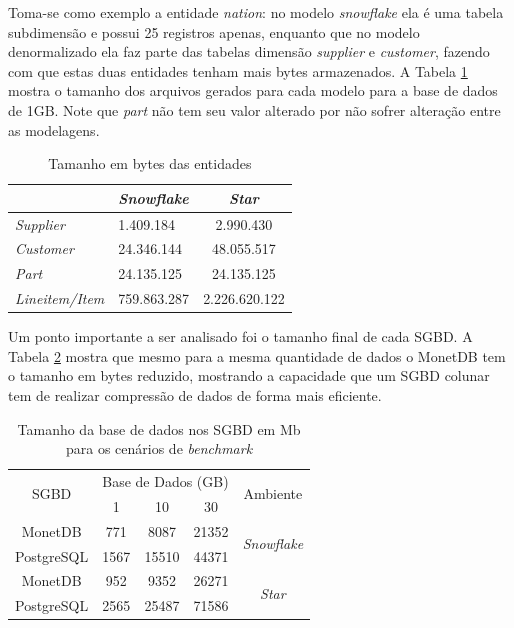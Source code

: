 Toma-se como exemplo a entidade \textit{nation}: no modelo \textit{snowflake} ela é uma tabela subdimensão e possui 25 registros apenas, enquanto que no modelo denormalizado ela faz parte das tabelas dimensão \textit{supplier} e \textit{customer}, fazendo com que estas duas entidades tenham mais bytes armazenados. A Tabela \ref{tab:tamanho} mostra o tamanho dos arquivos gerados para cada modelo para a base de dados de 1GB. Note que \textit{part} não tem seu valor alterado por não sofrer alteração entre as modelagens.

\begin{table}[htpb]
        \centering
        \caption{Tamanho em bytes das entidades}
        \label{tab:tamanho}
        \begin{tabular}{l|l|c|}
        \cline{2-3}
                                                     & \textit{Snowflake} & \textit{Star} \\ \hline
        \multicolumn{1}{|l|}{\textit{Supplier}}      & 1.409.184          & 2.990.430     \\ \hline
        \multicolumn{1}{|l|}{\textit{Customer}}      & 24.346.144         & 48.055.517    \\ \hline
        \multicolumn{1}{|l|}{\textit{Part}}          & 24.135.125         & 24.135.125    \\ \hline
        \multicolumn{1}{|l|}{\textit{Lineitem/Item}} & 759.863.287        & 2.226.620.122 \\ \hline
        \end{tabular}
        \end{table}


Um ponto importante a ser analisado foi o tamanho final de cada SGBD. A Tabela \ref{tab:carregamento_size} 
mostra que mesmo para a mesma quantidade de dados o MonetDB tem o tamanho em bytes reduzido, mostrando a capacidade 
que um SGBD colunar tem de realizar compressão de dados de forma mais eficiente.

\begin{table}[htpb]
    \centering
    \caption{Tamanho da base de dados nos SGBD em Mb para os cenários de \textit{benchmark}}
    \label{tab:carregamento_size}
    \begin{tabular}{c|ccc|c}
        \hline
        \multirow{2}{*}{SGBD} & \multicolumn{3}{c|}{Base de Dados (GB)} & \multirow{2}{*}{Ambiente}  \\
                              & 1           & 10          & 30          &                            \\ \hline
        MonetDB               & 771         & 8087        & 21352       & \multirow{2}{*}{\textit{Snowflake}} \\
        PostgreSQL            & 1567        & 15510       & 44371       &                            \\ \hline
        MonetDB               & 952         & 9352        & 26271       & \multirow{2}{*}{\textit{Star}}      \\
        PostgreSQL            & 2565        & 25487       & 71586       &                            \\ \hline
        \end{tabular}
    \end{table}


